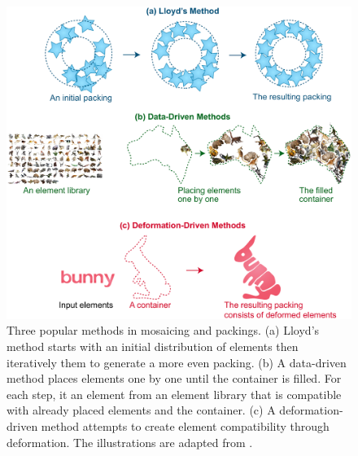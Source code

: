 \begin{figure}
\centering
\includegraphics[width=1.0\textwidth]{figures/related/taxonomy_method.pdf} 
\caption[Three popular methods in mosaicing and packings]
{\label{fig_taxonomy_method} 
\newtext
{
Three popular methods in mosaicing and packings.
(a) Lloyd's method starts with an initial distribution of elements then iteratively  them
to generate a more even packing. 
(b) A data-driven method places elements one by one until the container is filled.
For each step, it  an element from an element library that is compatible with already placed elements and the container.
(c) A deformation-driven method attempts to create element compatibility through deformation.
The illustrations are adapted from .
}
}
\end{figure}


